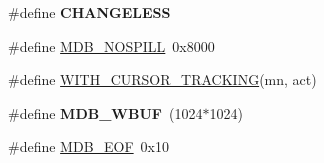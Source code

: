 \begin{DoxyCompactItemize}
\item 
\#define {\bfseries C\+H\+A\+N\+G\+E\+L\+E\+SS}
\item 
\#define \mbox{\hyperlink{group__internal_ga2216d72d26517bbe3d036007c2f8d20f}{M\+D\+B\+\_\+\+N\+O\+S\+P\+I\+LL}}~0x8000
\item 
\#define \mbox{\hyperlink{group__internal_ga46281cc01f9a7bf2e999d993a88fa958}{W\+I\+T\+H\+\_\+\+C\+U\+R\+S\+O\+R\+\_\+\+T\+R\+A\+C\+K\+I\+NG}}(mn,  act)
\item 
\mbox{\label{group__internal_ga7f073d1610429eb5bcd20cbc508bb743}} 
\#define {\bfseries M\+D\+B\+\_\+\+W\+B\+UF}~(1024$\ast$1024)
\item 
\#define \mbox{\hyperlink{group__internal_ga21baf54777b0859e49ca44ac0e336863}{M\+D\+B\+\_\+\+E\+OF}}~0x10
\end{DoxyCompactItemize}
